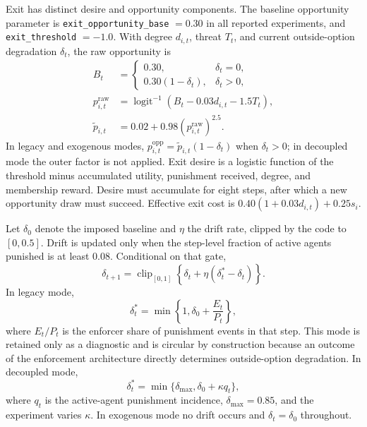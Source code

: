 \documentclass[12pt]{article}
\begin{document}
Exit has distinct desire and opportunity components. The baseline opportunity parameter is \texttt{exit\_opportunity\_base} \(=0.30\) in all reported experiments, and \texttt{exit\_threshold} \(=-1.0\). With degree \(d_{i,t}\), threat \(T_t\), and current outside-option degradation \(\delta_t\), the raw opportunity is
\begin{align}
 B_t&=\begin{cases}0.30,&\delta_t=0,\\0.30(1-\delta_t),&\delta_t>0,\end{cases}\\
 p^{\mathrm{raw}}_{i,t}&=\operatorname{logit}^{-1}(B_t-0.03d_{i,t}-1.5T_t),\\
 \widetilde p_{i,t}&=0.02+0.98\left(p^{\mathrm{raw}}_{i,t}\right)^{2.5}.
\end{align}
In legacy and exogenous modes, \(p^{\mathrm{opp}}_{i,t}=\widetilde p_{i,t}(1-\delta_t)\) when \(\delta_t>0\); in decoupled mode the outer factor is not applied. Exit desire is a logistic function of the threshold minus accumulated utility, punishment received, degree, and membership reward. Desire must accumulate for eight steps, after which a new opportunity draw must succeed. Effective exit cost is \(0.40(1+0.03d_{i,t})+0.25s_i\).

Let \(\delta_0\) denote the imposed baseline and \(\eta\) the drift rate, clipped by the code to \([0,0.5]\). Drift is updated only when the step-level fraction of active agents punished is at least 0.08. Conditional on that gate,
\begin{equation}
 \delta_{t+1}=\operatorname{clip}_{[0,1]}\left\{\delta_t+\eta(\delta_t^{*}-\delta_t)\right\}.
\end{equation}
In legacy mode,
\begin{equation}
 \delta_t^{*}=\min\left\{1,\delta_0+\frac{E_t}{P_t}\right\},
\end{equation}
where \(E_t/P_t\) is the enforcer share of punishment events in that step. This mode is retained only as a diagnostic and is circular by construction because an outcome of the enforcement architecture directly determines outside-option degradation. In decoupled mode,
\begin{equation}
 \delta_t^{*}=\min\{\delta_{\max},\delta_0+\kappa q_t\},
\end{equation}
where \(q_t\) is the active-agent punishment incidence, \(\delta_{\max}=0.85\), and the experiment varies \(\kappa\). In exogenous mode no drift occurs and \(\delta_t=\delta_0\) throughout.
\end{document}

